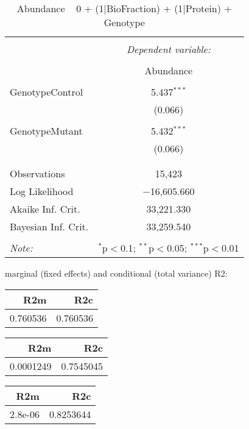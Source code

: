 \documentclass[11pt]{report}
\begin{document}
\begin{table}[!htbp] \centering 
  \caption{Abundance ~ 0 + (1|BioFraction) + (1|Protein) + Genotype} 
  \label{} 
\begin{tabular}{@{\extracolsep{5pt}}lc} 
\\[-1.8ex]\hline 
\hline \\[-1.8ex] 
 & \multicolumn{1}{c}{\textit{Dependent variable:}} \\ 
\cline{2-2} 
\\[-1.8ex] & Abundance \\ 
\hline \\[-1.8ex] 
 GenotypeControl & 5.437$^{***}$ \\ 
  & (0.066) \\ 
  & \\ 
 GenotypeMutant & 5.432$^{***}$ \\ 
  & (0.066) \\ 
  & \\ 
\hline \\[-1.8ex] 
Observations & 15,423 \\ 
Log Likelihood & $-$16,605.660 \\ 
Akaike Inf. Crit. & 33,221.330 \\ 
Bayesian Inf. Crit. & 33,259.540 \\ 
\hline 
\hline \\[-1.8ex] 
\textit{Note:}  & \multicolumn{1}{r}{$^{*}$p$<$0.1; $^{**}$p$<$0.05; $^{***}$p$<$0.01} \\ 
\end{tabular} 
\end{table} 
marginal (fixed effects) and conditional (total variance) R2:

\begin{tabular}{r|r}
\hline
R2m & R2c\\
\hline
0.760536 & 0.760536\\
\hline
\end{tabular}

\begin{tabular}{r|r}
\hline
R2m & R2c\\
\hline
0.0001249 & 0.7545045\\
\hline
\end{tabular}

\begin{tabular}{r|r}
\hline
R2m & R2c\\
\hline
2.8e-06 & 0.8253644\\
\hline
\end{tabular}
\end{document}
